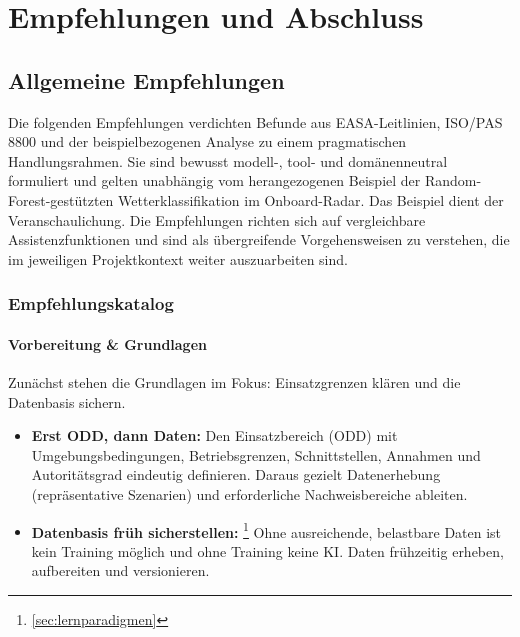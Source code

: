 \part{Empfehlungen und Abschluss}

\chapter{Allgemeine Empfehlungen}\label{chap:empfehlungen}

Die folgenden Empfehlungen verdichten Befunde aus EASA-Leitlinien, 
ISO/PAS 8800 und der beispielbezogenen Analyse zu einem pragmatischen 
Handlungsrahmen. Sie sind bewusst modell-, tool- und domänenneutral formuliert 
und gelten unabhängig vom herangezogenen Beispiel der Random-Forest-gestützten 
Wetterklassifikation im Onboard-Radar. Das Beispiel dient der Veranschaulichung. 
Die Empfehlungen richten sich auf vergleichbare Assistenzfunktionen und sind als 
übergreifende Vorgehensweisen zu verstehen, die im jeweiligen Projektkontext weiter auszuarbeiten sind.




\section*{Empfehlungskatalog}

\subsection*{Vorbereitung \& Grundlagen}
Zunächst stehen die Grundlagen im Fokus: Einsatzgrenzen klären und die Datenbasis sichern.

\medskip
\begin{itemize}
  \item \textbf{Erst ODD, dann Daten:} 
        Den Einsatzbereich (ODD) mit Umgebungsbedingungen, Betriebsgrenzen, Schnittstellen, Annahmen und Autoritätsgrad eindeutig definieren. 
        Daraus gezielt Datenerhebung (repräsentative Szenarien) und erforderliche Nachweisbereiche ableiten. 

  \item \textbf{Datenbasis früh sicherstellen:} \footnote{\ref{sec:lernparadigmen} }
        Ohne ausreichende, belastbare Daten ist kein Training möglich und ohne Training keine KI. 
        Daten frühzeitig erheben, aufbereiten und versionieren.

\end{itemize}

